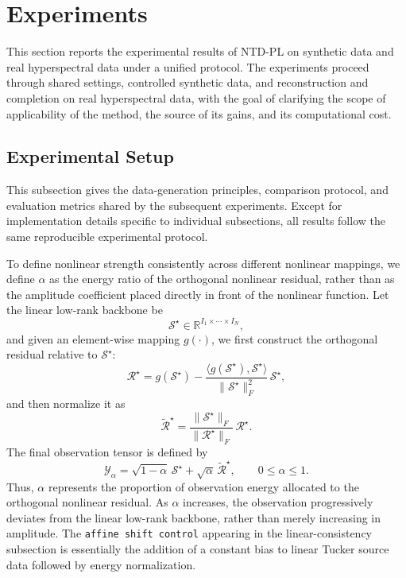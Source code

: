 \section{Experiments}
\label{sec:experiments}

This section reports the experimental results of NTD-PL on synthetic data and real hyperspectral data under a unified protocol. The experiments proceed through shared settings, controlled synthetic data, and reconstruction and completion on real hyperspectral data, with the goal of clarifying the scope of applicability of the method, the source of its gains, and its computational cost.

\subsection{Experimental Setup}
\label{sec:exp-setup}

This subsection gives the data-generation principles, comparison protocol, and evaluation metrics shared by the subsequent experiments. Except for implementation details specific to individual subsections, all results follow the same reproducible experimental protocol.

To define nonlinear strength consistently across different nonlinear mappings, we define $\alpha$ as the energy ratio of the orthogonal nonlinear residual, rather than as the amplitude coefficient placed directly in front of the nonlinear function. Let the linear low-rank backbone be
\begin{equation}
\mathcal S^\star \in \mathbb R^{I_1\times \cdots \times I_N},
\end{equation}
and given an element-wise mapping $g(\cdot)$, we first construct the orthogonal residual relative to $\mathcal S^\star$:
\begin{equation}
\mathcal R^\star
=
g(\mathcal S^\star)
-
\frac{\langle g(\mathcal S^\star), \mathcal S^\star\rangle}{\|\mathcal S^\star\|_F^2}\,\mathcal S^\star,
\end{equation}
and then normalize it as
\begin{equation}
\widetilde{\mathcal R}^\star
=
\frac{\|\mathcal S^\star\|_F}{\|\mathcal R^\star\|_F}\,\mathcal R^\star.
\end{equation}
The final observation tensor is defined by
\begin{equation}
\mathcal Y_\alpha
=
\sqrt{1-\alpha}\,\mathcal S^\star
+
\sqrt{\alpha}\,\widetilde{\mathcal R}^\star,
\qquad 0\le \alpha\le 1.
\label{eq:exp-alpha-energy}
\end{equation}
Thus, $\alpha$ represents the proportion of observation energy allocated to the orthogonal nonlinear residual. As $\alpha$ increases, the observation progressively deviates from the linear low-rank backbone, rather than merely increasing in amplitude. The \texttt{affine shift control} appearing in the linear-consistency subsection is essentially the addition of a constant bias to linear Tucker source data followed by energy normalization.

